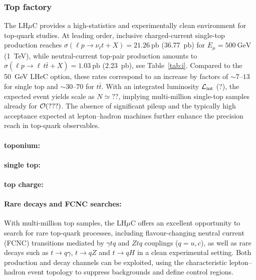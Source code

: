 \documentclass[a4paper,11pt]{article}
\begin{document}
\subsubsection{Top factory}\label{subsubsec:topfactory}

The LH$\mu$C provides a high-statistics and experimentally clean environment for top-quark studies.
At leading order, inclusive charged-current single-top production reaches
$\sigma(\ell p\to \nu_\ell t+X)=21.26~\mathrm{pb}$ (36.77~pb) for $E_\mu=500~\mathrm{GeV}$ (1~TeV),
while neutral-current top-pair production amounts to
$\sigma(\ell p\to \ell\,t\bar t+X)=1.03~\mathrm{pb}$ (2.23~pb), see Table~\ref{tab:i}.
Compared to the 50~GeV LHeC option, these rates correspond to an increase by factors of
$\sim 7$--$13$ for single top and $\sim 30$--$70$ for $t\bar t$.
With an integrated luminosity ${\cal L}_{\rm int}$ (?), the expected event yields scale as
$N \simeq ??$, implying multi-million single-top samples already for ${\cal O}(???)$.
The absence of significant pileup and the typically high acceptance expected at lepton--hadron machines
further enhance the precision reach in top-quark observables. 





\paragraph{toponium:}




\paragraph{single top:}




\paragraph{top charge:}





\paragraph{Rare decays and FCNC searches:}

With multi-million top samples, the LH$\mu$C offers an excellent opportunity to search for rare top-quark processes,
including flavour-changing neutral current  (FCNC) transitions mediated by $\gamma t q$ and $Z t q$ couplings ($q=u,c$),
as well as rare decays such as $t\to q\gamma$, $t\to qZ$ and $t\to qH$ in a clean experimental setting.
Both production and decay channels can be exploited, using the characteristic lepton--hadron event topology
to suppress backgrounds and define control regions. 
\end{document}

